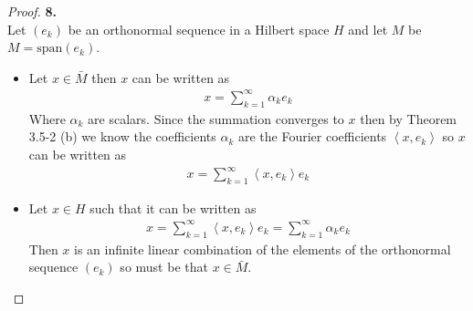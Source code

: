 \documentclass[11pt]{article}
\newcommand{\inprd}[1]{\left\langle{#1}\right\rangle}
\theoremstyle{definition}
\begin{document}
\cleardoublepage
\begin{proof}{\textbf{8.}}\\
Let $(e_k)$ be an orthonormal sequence in a Hilbert space $H$ and let $M$ be
$M = \text{span}(e_k)$.
\begin{itemize}
\item [($\Rightarrow$)]
Let $x \in \bar{M}$ then $x$ can be written as 
\begin{align*}
    x = \sum_{k=1}^\infty \alpha_k e_k
\end{align*}
Where $\alpha_k$ are scalars. Since the summation converges to $x$ then by
Theorem 3.5-2 (b) we know the coefficients $\alpha_k$ are the Fourier 
coefficients $\inprd{x, e_k}$ so $x$ can be written as
\begin{align*}
    x = \sum_{k=1}^\infty \inprd{x, e_k}e_k
\end{align*}
\item [($\Leftarrow$)]
Let $x\in H$ such that it can be written as
\begin{align*}
    x = \sum_{k=1}^\infty \inprd{x, e_k}e_k
    = \sum_{k=1}^\infty \alpha_ke_k
\end{align*}
Then $x$ is an infinite linear combination of the elements of the orthonormal
sequence $(e_k)$ so must be that $x \in \bar{M}$.
\end{itemize}
\end{proof}
\end{document}
